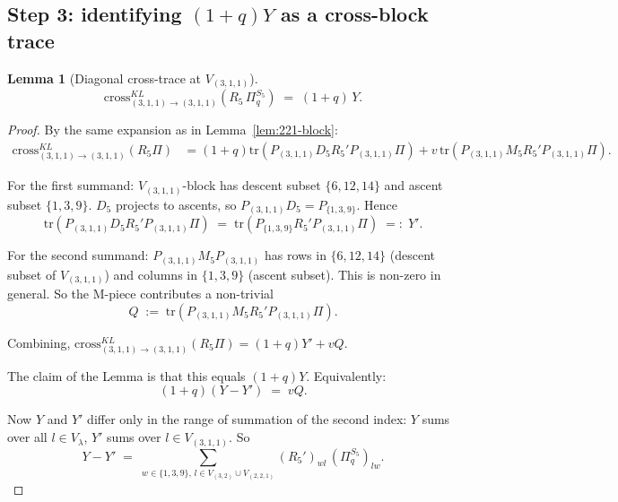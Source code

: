 \documentclass[11pt]{article}
\newtheorem{lemma}[theorem]{Lemma}
\theoremstyle{definition}
\begin{document}
\subsection*{Step 3: identifying $(1+q)Y$ as a cross-block trace}

\begin{lemma}[Diagonal cross-trace at $V_{(3,1,1)}$]\label{lem:311-block}
\[
\mathrm{cross}_{(3,1,1) \to (3,1,1)}^{KL}(R_5\,\Pi_q^{S_5}) \;=\; (1+q)\, Y.
\]
\end{lemma}

\begin{proof}
By the same expansion as in Lemma~\ref{lem:221-block}:
\begin{align*}
\mathrm{cross}_{(3,1,1) \to (3,1,1)}^{KL}(R_5 \Pi)
&= (1+q)\mathrm{tr}(P_{(3,1,1)} D_5 R_5' P_{(3,1,1)} \Pi) + v\,\mathrm{tr}(P_{(3,1,1)} M_5 R_5' P_{(3,1,1)} \Pi).
\end{align*}

For the first summand: $V_{(3,1,1)}$-block has descent subset $\{6, 12, 14\}$ and
ascent subset $\{1, 3, 9\}$. $D_5$ projects to ascents, so $P_{(3,1,1)} D_5 = P_{\{1,3,9\}}$.
Hence
\[
\mathrm{tr}(P_{(3,1,1)} D_5 R_5' P_{(3,1,1)} \Pi) \;=\; \mathrm{tr}(P_{\{1,3,9\}} R_5' P_{(3,1,1)} \Pi) \;=:\; Y'.
\]

For the second summand: $P_{(3,1,1)} M_5 P_{(3,1,1)}$ has rows in $\{6,12,14\}$
(descent subset of $V_{(3,1,1)}$) and columns in $\{1,3,9\}$ (ascent subset).
This is non-zero in general. So the M-piece contributes a non-trivial
\[
Q \;:=\; \mathrm{tr}(P_{(3,1,1)} M_5 R_5' P_{(3,1,1)} \Pi).
\]

Combining, $\mathrm{cross}_{(3,1,1) \to (3,1,1)}^{KL}(R_5 \Pi) = (1+q) Y' + v Q$.

The claim of the Lemma is that this equals $(1+q) Y$. Equivalently:
\begin{equation}\label{eq:Y-equiv}
(1+q) (Y - Y') \;=\; v Q.
\end{equation}

Now $Y$ and $Y'$ differ only in the range of summation of the second index:
$Y$ sums over all $l \in V_\lambda$, $Y'$ sums over $l \in V_{(3,1,1)}$. So
\[
Y - Y' \;=\; \sum_{w \in \{1, 3, 9\},\, l \in V_{(3,2)} \cup V_{(2,2,1)}} (R_5')_{wl}\,(\Pi_q^{S_5})_{lw}.
\]


\end{proof}
\end{document}

